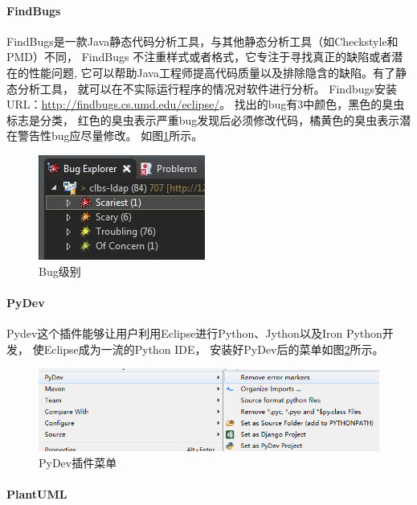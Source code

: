 \documentclass{book}
\begin{document}
\paragraph{FindBugs}

FindBugs是一款Java静态代码分析工具，与其他静态分析工具（如Checkstyle和PMD）不同，
FindBugs 不注重样式或者格式，它专注于寻找真正的缺陷或者潜在的性能问题,
它可以帮助Java工程师提高代码质量以及排除隐含的缺陷。有了静态分析工具，
就可以在不实际运行程序的情况对软件进行分析。
Findbugs安装URL：\url{http://findbugs.cs.umd.edu/eclipse/}。
找出的bug有3中颜色，黑色的臭虫标志是分类，
红色的臭虫表示严重bug发现后必须修改代码，橘黄色的臭虫表示潜在警告性bug应尽量修改。
如图\ref{code:JavaFindBugsPluginView}所示。

\begin{figure}[htbp]
	\centering
	\includegraphics[scale=1]{JavaFindBugsPluginView.jpg}
	\caption{Bug级别}
	\label{code:JavaFindBugsPluginView}
\end{figure}

\paragraph{PyDev}

Pydev这个插件能够让用户利用Eclipse进行Python、Jython以及Iron Python开发，
使Eclipse成为一流的Python IDE，
安装好PyDev后的菜单如图\ref{fig:PythonDevelopmentPluginMenu}所示。

\begin{figure}[htbp]
	\centering
	\includegraphics[scale=0.6]{PythonDevelopmentPluginMenu.png}
	\caption{PyDev插件菜单}
	\label{fig:PythonDevelopmentPluginMenu}
\end{figure}

\paragraph{PlantUML}
\end{document}
